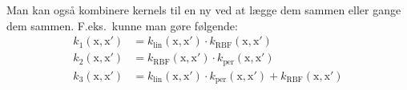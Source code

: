 \documentclass[10pt,twoside]{scrartcl}
\renewcommand{\vec}[1]{\bm{\mathrm{#1}}}        %
\begin{document}
Man kan også kombinere kernels til en ny ved at lægge dem sammen eller gange dem
sammen. F.eks.\ kunne man gøre følgende:
\begin{align}
    \label{eq:kernel combinations}
    k_1(\vec x, \vec x') &= k_\text{lin}(\vec x, \vec x') \cdot
    k_\text{RBF}(\vec x, \vec x')\\
    k_2(\vec x, \vec x') &= k_\text{RBF}(\vec x, \vec x') \cdot
    k_\text{per}(\vec x, \vec x')\\
    k_3(\vec x, \vec x') &= k_\text{lin}(\vec x, \vec x') \cdot
    k_\text{per}(\vec x, \vec x') + k_\text{RBF}(\vec x, \vec x')
\end{align}




%

%
\end{document}
